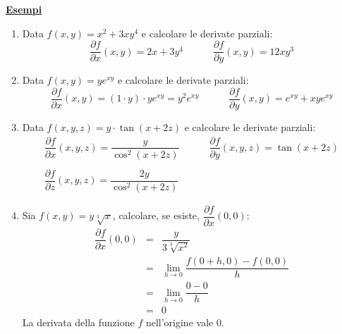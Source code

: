 \documentclass[a4paper]{article}
\newcommand{\example}[1]{\textcolor{Green4}{\textbf{#1}}}
\begin{document}
	\begin{flushleft}
		\example{\underline{Esempi}}
	\end{flushleft}
	\begin{enumerate}[label=\alph*)]
		\item Data $f\left(x,y\right) = x^{2} + 3xy^{4}$ e calcolare le derivate parziali:
		\begin{equation*}
			\dfrac{\partial f}{\partial x}\left(x, y\right) = 2x + 3y^{4} \hspace{3em}
			\dfrac{\partial f}{\partial y}\left(x, y\right) = 12xy^{3}
		\end{equation*}

		\item Data $f\left(x,y\right) = ye^{xy}$ e calcolare le derivate parziali:
		\begin{equation*}
			\dfrac{\partial f}{\partial x}\left(x, y\right) = \left(1\cdot y\right) \cdot ye^{xy} = y^{2} e^{xy} \hspace{3em}
			\dfrac{\partial f}{\partial y}\left(x, y\right) = e^{xy} + xye^{xy}
		\end{equation*}

		\item Data $f\left(x,y,z\right) = y \cdot \tan\left(x+2z\right)$ e calcolare le derivate parziali:
		\begin{gather*}
			\dfrac{\partial f}{\partial x}\left(x, y, z\right) = \dfrac{y}{\cos^{2}\left(x+2z\right)} \hspace{3em}
			\dfrac{\partial f}{\partial y}\left(x, y, z\right) = \tan\left(x+2z\right) \\ \\
			\dfrac{\partial f}{\partial z}\left(x, y, z\right) = \dfrac{2y}{\cos^{2}\left(x+2z\right)}
		\end{gather*}

		\item Sia $f\left(x,y\right) = y\sqrt[3]{x}$, calcolare, se esiste, $\dfrac{\partial f}{\partial x}\left(0,0\right)$:
		\begin{equation*}
			\begin{array}{rcl}
				\dfrac{\partial f}{\partial x}\left(0,0\right) &=& \dfrac{y}{3\sqrt[3]{x^{2}}} \\ [1em]
				&=& \displaystyle\lim_{h\rightarrow 0} \dfrac{f\left(0+h,0\right)-f\left(0,0\right)}{h} \\
				&=& \displaystyle\lim_{h\rightarrow 0} \dfrac{0-0}{h} \\ 
				&=& 0
			\end{array}
		\end{equation*}
		La derivata della funzione $f$ nell'origine vale $0$.


\end{enumerate}
\end{document}
